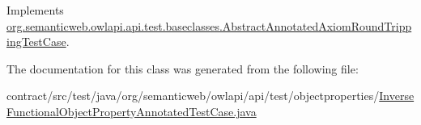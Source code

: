 Implements \hyperlink{classorg_1_1semanticweb_1_1owlapi_1_1api_1_1test_1_1baseclasses_1_1_abstract_annotated_axiom_round_tripping_test_case_a6afbb12cdaa7995823a6bb2a3a60ba8c}{org.\-semanticweb.\-owlapi.\-api.\-test.\-baseclasses.\-Abstract\-Annotated\-Axiom\-Round\-Tripping\-Test\-Case}.



The documentation for this class was generated from the following file\-:\begin{DoxyCompactItemize}
\item 
contract/src/test/java/org/semanticweb/owlapi/api/test/objectproperties/\hyperlink{_inverse_functional_object_property_annotated_test_case_8java}{Inverse\-Functional\-Object\-Property\-Annotated\-Test\-Case.\-java}\end{DoxyCompactItemize}
